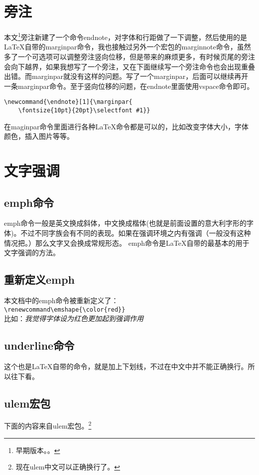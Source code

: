 \section{旁注}
本文\footnote{早期版本。。}旁注新建了一个命令endnote，对字体和行距做了一下调整，然后使用的是\LaTeX 自带的marginpar命令，我也接触过另外一个宏包的marginnote命令，虽然多了一个可选项可以调整旁注竖向位移，但是带来的麻烦更多，有时候页尾的旁注会向下越界，如果我想写了一个旁注，又在下面继续写一个旁注命令也会出现重叠出错。而marginpar就没有这样的问题。写了一个marginpar，后面可以继续再开一条marginpar命令。至于竖向位移的问题，在endnote里面使用vspace命令即可。
\begin{verbatim}
\newcommand{\endnote}[1]{\marginpar{  
 	\fontsize{10pt}{20pt}\selectfont #1}}
\end{verbatim}

在maginpar命令里面进行各种\LaTeX 命令都是可以的，比如改变字体大小，字体颜色，插入图片等等。


\section{文字强调}
\subsection{emph命令}
emph命令一般是英文换成斜体，中文换成楷体(也就是前面设置的意大利字形的字体)。不过不同字族会有不同的表现。如果在强调环境之内有强调（一般没有这种情况把。）那么文字又会换成常规形态。
emph命令是\LaTeX 自带的最基本的用于文字强调的方法。


\subsection{重新定义emph}
本文档中的emph命令被重新定义了：\\
\verb+\renewcommand\emshape{\color{red}}+\\
比如：\emph{我觉得字体设为红色更加起到强调作用}

\subsection{underline命令}
这个也是\LaTeX 自带的命令，就是加上下划线，不过在中文中并不能正确换行。所以往下看。

\subsection{ulem宏包}
下面的内容来自ulem宏包。\footnote{现在ulem中文可以正确换行了。}

